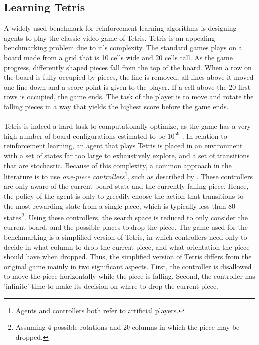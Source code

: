 \subsection{Learning Tetris \label{sec:learningTetris}}

A widely used benchmark
for reinforcement learning algorithms is designing agents 
to play the classic video game of Tetris. Tetris is an 
appealing benchmarking problem due to it's complexity. The 
standard games plays on a board made from a grid that is
10 cells wide and 20 cells tall. As the game progress, differently
shaped pieces fall from the top of the board. 
When a row on the board is fully occupied by pieces, the line
is removed, all lines above it moved one line down and a score
point is given to the player. If a cell above the 20 first rows is
occupied, the game ends. The task of the player is to move
and rotate the falling pieces in a way that yields the highest 
score before the game ends.\\
\\
Tetris is indeed a hard task to computationally optimize, as
the game has a very high number of board configurations estimated to be
$10^{59}$ \citep{scherrer2009}. In relation to reinforcement learning,
an agent that plays Tetris is placed in an environment with a set of 
states far too large to exhaustively explore, and a set of transitions
that are stochastic. Because of this
complexity, a common approach 
in the literature is to use 
\textit{one-piece controllers}\footnote{Agents and controllers
both refer to artificial players.}, such as described by 
\cite{scherrer2009:b}. These controllers are only aware of
the current board state and the currently falling piece.
Hence, the policy of the agent is only to greedily choose
the action that transitions to the most rewarding state
from a single piece, which is typically less than 80 states\footnote{
Assuming 4 possible rotations and 20 columns
in which the piece may be dropped.}.
Using these controllers, the search space is reduced 
to only consider the current board, and the possible 
places to drop the piece. 
The game used for the benchmarking is a simplified version of Tetris,
in which 
controllers need only to decide in what column to drop the current
piece, and what orientation the piece should have when dropped.
Thus, the simplified version of Tetris differs from the 
original game mainly in two significant aspects. 
First, the controller is 
disallowed to move the piece horizontally while the piece 
is falling. Second, the controller has 'infinite'
time to make its decision on where to drop the current piece.
